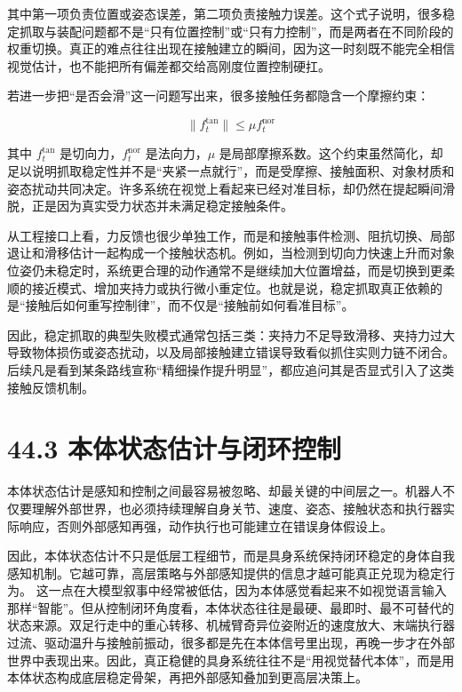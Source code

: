其中第一项负责位置或姿态误差，第二项负责接触力误差。这个式子说明，很多稳定抓取与装配问题都不是“只有位置控制”或“只有力控制”，而是两者在不同阶段的权重切换。真正的难点往往出现在接触建立的瞬间，因为这一时刻既不能完全相信视觉估计，也不能把所有偏差都交给高刚度位置控制硬扛。

若进一步把“是否会滑”这一问题写出来，很多接触任务都隐含一个摩擦约束：

\begin{equation*}
\|f_t^{\text{tan}}\| \le \mu f_t^{\text{nor}}
\end{equation*}

其中 \(f_t^{\text{tan}}\) 是切向力，\(f_t^{\text{nor}}\) 是法向力，\(\mu\) 是局部摩擦系数。这个约束虽然简化，却足以说明抓取稳定性并不是“夹紧一点就行”，而是受摩擦、接触面积、对象材质和姿态扰动共同决定。许多系统在视觉上看起来已经对准目标，却仍然在提起瞬间滑脱，正是因为真实受力状态并未满足稳定接触条件。

从工程接口上看，力反馈也很少单独工作，而是和接触事件检测、阻抗切换、局部退让和滑移估计一起构成一个接触状态机。例如，当检测到切向力快速上升而对象位姿仍未稳定时，系统更合理的动作通常不是继续加大位置增益，而是切换到更柔顺的接近模式、增加夹持力或执行微小重定位。也就是说，稳定抓取真正依赖的是“接触后如何重写控制律”，而不仅是“接触前如何看准目标”。

因此，稳定抓取的典型失败模式通常包括三类：夹持力不足导致滑移、夹持力过大导致物体损伤或姿态扰动，以及局部接触建立错误导致看似抓住实则力链不闭合。后续凡是看到某条路线宣称“精细操作提升明显”，都应追问其是否显式引入了这类接触反馈机制。

\section*{44.3 本体状态估计与闭环控制}


本体状态估计是感知和控制之间最容易被忽略、却最关键的中间层之一。机器人不仅要理解外部世界，也必须持续理解自身关节、速度、姿态、接触状态和执行器实际响应，否则外部感知再强，动作执行也可能建立在错误身体假设上。

因此，本体状态估计不只是低层工程细节，而是具身系统保持闭环稳定的身体自我感知机制。它越可靠，高层策略与外部感知提供的信息才越可能真正兑现为稳定行为。 这一点在大模型叙事中经常被低估，因为本体感觉看起来不如视觉语言输入那样“智能”。但从控制闭环角度看，本体状态往往是最硬、最即时、最不可替代的状态来源。双足行走中的重心转移、机械臂奇异位姿附近的速度放大、末端执行器过流、驱动温升与接触前振动，很多都是先在本体信号里出现，再晚一步才在外部世界中表现出来。因此，真正稳健的具身系统往往不是“用视觉替代本体”，而是用本体状态构成底层稳定骨架，再把外部感知叠加到更高层决策上。

